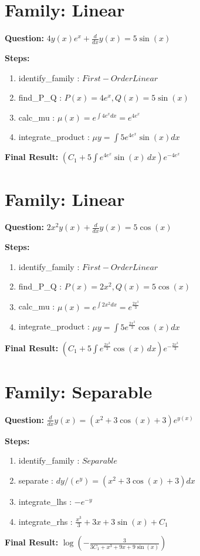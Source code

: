 \documentclass{article}
\begin{document}
\section*{Family: Linear}
\textbf{Question:} $4 y{\left(x \right)} e^{x} + \frac{d}{d x} y{\left(x \right)} = 5 \sin{\left(x \right)}$

\textbf{Steps:}
\begin{enumerate}
\item identify_family :  $First-Order Linear$
\item find_P_Q :  $P(x)=4 e^{x}, Q(x)=5 \sin{\left(x \right)}$
\item calc_mu :  $\mu(x) = e^{\int 4 e^{x} dx} = e^{4 e^{x}}$
\item integrate_product :  $\mu y = \int 5 e^{4 e^{x}} \sin{\left(x \right)} dx$
\end{enumerate}
\textbf{Final Result:} $\left(C_{1} + 5 \int e^{4 e^{x}} \sin{\left(x \right)}\, dx\right) e^{- 4 e^{x}}$

\section*{Family: Linear}
\textbf{Question:} $2 x^{2} y{\left(x \right)} + \frac{d}{d x} y{\left(x \right)} = 5 \cos{\left(x \right)}$

\textbf{Steps:}
\begin{enumerate}
\item identify_family :  $First-Order Linear$
\item find_P_Q :  $P(x)=2 x^{2}, Q(x)=5 \cos{\left(x \right)}$
\item calc_mu :  $\mu(x) = e^{\int 2 x^{2} dx} = e^{\frac{2 x^{3}}{3}}$
\item integrate_product :  $\mu y = \int 5 e^{\frac{2 x^{3}}{3}} \cos{\left(x \right)} dx$
\end{enumerate}
\textbf{Final Result:} $\left(C_{1} + 5 \int e^{\frac{2 x^{3}}{3}} \cos{\left(x \right)}\, dx\right) e^{- \frac{2 x^{3}}{3}}$

\section*{Family: Separable}
\textbf{Question:} $\frac{d}{d x} y{\left(x \right)} = \left(x^{2} + 3 \cos{\left(x \right)} + 3\right) e^{y{\left(x \right)}}$

\textbf{Steps:}
\begin{enumerate}
\item identify_family :  $Separable$
\item separate :  $dy / (e^{y}) = (x^{2} + 3 \cos{\left(x \right)} + 3) dx$
\item integrate_lhs :  $- e^{- y}$
\item integrate_rhs :  $\frac{x^{3}}{3} + 3 x + 3 \sin{\left(x \right)} + C_1$
\end{enumerate}
\textbf{Final Result:} $\log{\left(- \frac{3}{3 C_{1} + x^{3} + 9 x + 9 \sin{\left(x \right)}} \right)}$
\end{document}
